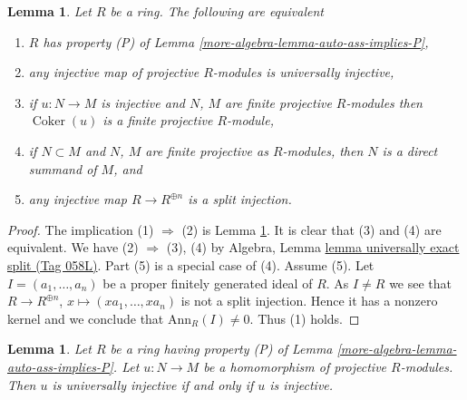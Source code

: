 \documentclass{amsart}
\theoremstyle{plain}
\newtheorem{lemma}[subsection]{Lemma}
\theoremstyle{definition}
\theoremstyle{remark}
\numberwithin{equation}{subsection}
\def\Coker{\mathop{\mathrm{Coker}}}
\begin{document}
\begin{lemma}
\label{more-algebra-lemma-P-fPD-zero}
Let $R$ be a ring. The following are equivalent
\begin{enumerate}
\item $R$ has property (P) of
Lemma \ref{more-algebra-lemma-auto-ass-implies-P},
\item any injective map of projective $R$-modules is
universally injective,
\item if $u : N \to M$ is injective and $N$, $M$ are finite projective
$R$-modules then $\Coker(u)$ is a finite projective $R$-module,
\item if $N \subset M$ and $N$, $M$ are finite projective as $R$-modules, then
$N$ is a direct summand of $M$, and
\item any injective map $R \to R^{\oplus n}$ is a split injection.
\end{enumerate}
\end{lemma}

\begin{proof}
The implication (1) $\Rightarrow$ (2) is
Lemma \ref{more-algebra-lemma-P-universally-injective}.
It is clear that (3) and (4) are equivalent.
We have (2) $\Rightarrow$ (3), (4) by
Algebra, Lemma \href{https://stacks.math.columbia.edu/tag/058L}{lemma universally exact split (Tag 058L)}.
Part (5) is a special case of (4).
Assume (5). Let $I = (a_1, \ldots, a_n)$ be a proper finitely generated
ideal of $R$. As $I \not = R$ we see that
$R \to R^{\oplus n}$, $x \mapsto (xa_1, \ldots, xa_n)$
is not a split injection. Hence it has a nonzero kernel and we conclude
that $\text{Ann}_R(I) \not = 0$. Thus (1) holds.
\end{proof}


\begin{lemma}
\label{more-algebra-lemma-P-universally-injective}
Let $R$ be a ring having property (P) of
Lemma \ref{more-algebra-lemma-auto-ass-implies-P}.
Let $u : N \to M$ be a homomorphism of projective $R$-modules.
Then $u$ is universally injective if and only if $u$ is injective.
\end{lemma}
\end{document}
